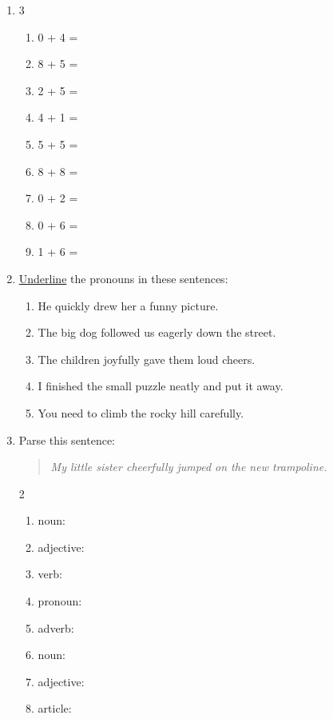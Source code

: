 \documentclass{tufte-book}
\begin{document}
\begin{enumerate}
  \item
  \begin{multicols}{3}
    \begin{enumerate}\bigskip
      \item 0 + 4 = \dotfill\bigskip
      \item 8 + 5 = \dotfill\bigskip
      \item 2 + 5 = \dotfill
      \item 4 + 1 = \dotfill\bigskip
      \item 5 + 5 = \dotfill\bigskip
      \item 8 + 8 = \dotfill
      \item 0 + 2 = \dotfill\bigskip
      \item 0 + 6 = \dotfill\bigskip
      \item 1 + 6 = \dotfill
    \end{enumerate}
  \end{multicols}

  \item \underline{Underline} the pronouns in these sentences:
  \begin{enumerate}
    \item He quickly drew her a funny picture.
    \item The big dog followed us eagerly down the street.
    \item The children joyfully gave them loud cheers.
    \item I finished the small puzzle neatly and put it away.
    \item You need to climb the rocky hill carefully.
  \end{enumerate}

  \item Parse this sentence:
  \begin{quote}
    \textit{My little sister cheerfully jumped on the new trampoline.}
  \end{quote}
  \begin{multicols}{2}
  \begin{enumerate}\bigskip
    \item noun: \dotfill\bigskip
    \item adjective: \dotfill\bigskip
    \item verb: \dotfill\bigskip
    \item pronoun: \dotfill
    \item adverb: \dotfill\bigskip
    \item noun: \dotfill\bigskip
    \item adjective: \dotfill\bigskip
    \item article: \dotfill
  \end{enumerate}
  \end{multicols}


\end{enumerate}
\end{document}
